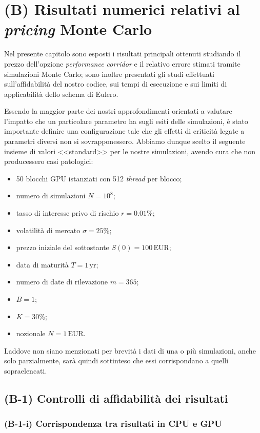 \chapter{(B) Risultati numerici relativi al \textit{pricing} Monte Carlo}
Nel presente capitolo sono esposti i risultati principali ottenuti studiando il prezzo dell'opzione \textit{performance corridor} e il relativo errore stimati tramite simulazioni Monte Carlo; sono inoltre presentati gli studi effettuati sull'affidabilità del nostro codice, sui tempi di esecuzione e sui limiti di applicabilità dello schema di Eulero.

Essendo la maggior parte dei nostri approfondimenti orientati a valutare l'impatto che un particolare parametro ha sugli esiti delle simulazioni, è stato importante definire una configurazione tale che gli effetti di criticità legate a parametri diversi non si sovrapponessero. Abbiamo dunque scelto il seguente insieme di valori <<standard>> per le nostre simulazioni, avendo cura che non producessero casi patologici:
\begin{itemize}
    \item 50 blocchi GPU istanziati con 512 \textit{thread} per blocco;
    \item numero di simulazioni $N={10}^8$;
    \item tasso di interesse privo di rischio $r=0.01\%$;
    \item volatilità di mercato $\sigma=25\%$;
    \item prezzo iniziale del sottostante $S(0)=100\,\text{EUR}$;
    \item data di maturità $T= 1\,\text{yr}$;
    \item numero di date di rilevazione $m=365$;
    \item $B=1$;
    \item $K=30\%$;
    \item nozionale $N=1\,\text{EUR}$.
\end{itemize}

Laddove non siano menzionati per brevità i dati di una o più simulazioni, anche solo parzialmente, sarà quindi sottinteso che essi corrispondano a quelli sopraelencati.

\section{(B-1) Controlli di affidabilità dei risultati}
\subsection{(B-1-i) Corrispondenza tra risultati in CPU e GPU} \label{sec:cpugpu}

